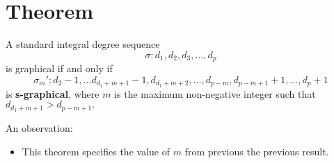 \section{Theorem}

\begin{frame}
	\begin{theorem}
		A standard integral degree sequence 
		\begin{equation}
			\sigma: d_1,d_2,d_3,\ldots, d_p
		\end{equation}
		is graphical if and only if 
		\begin{equation*}
			\sigma_m':d_2-1,\ldots d_{d_1+m+1}-1,d_{d_1+m+2},\ldots, d_{p-m},d_{p-m+1}+1,\ldots,d_p+1
		\end{equation*}
		is \textbf{s-graphical}, where $m$ is the maximum non-negative integer such that $d_{d_1+m+1}>d_{p-m+1}.$
	\end{theorem}
		An observation:
	\begin{itemize}
		\item This theorem specifies the value of $m$ from previous the previous result.
	\end{itemize}
\end{frame}


\begin{frame}

\end{frame}